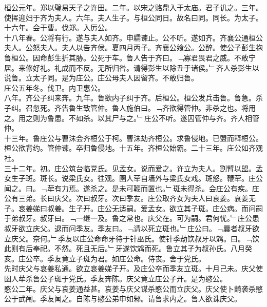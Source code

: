 \documentclass{zhvt-classic}
\begin{document}
\hspace*{2em}桓公元年。郑以璧易天子之许田。二年。以宋之赂鼎入于太庙。君子讥之。三年。使挥迎妇于齐为夫人。六年。夫人生子。与桓公同日。故名曰同。同长。为太子。\\
\hspace*{2em}十六年。会于曹。伐郑。入厉公。\\
\hspace*{2em}十八年春。公将有行。遂与夫人如齐。申繻谏止。公不听。遂如齐。齐襄公通桓公夫人。公怒夫人。夫人以告齐侯。夏四月丙子。齐襄公飨公。公醉。使公子彭生抱鲁桓公。因命彭生折其胁。公死于车。鲁人告于齐曰。﹁寡君畏君之威。不敢宁居。来修好礼。礼成而不反。无所归咎。请得彭生以除丑于诸侯。﹂齐人杀彭生以说鲁。立太子同。是为庄公。庄公母夫人因留齐。不敢归鲁。\\
\hspace*{2em}庄公五年冬。伐卫。内卫惠公。\\
\hspace*{2em}八年。齐公子纠来奔。九年。鲁欲内子纠于齐。后桓公。桓公发兵击鲁。鲁急。杀子纠。召忽死。齐告鲁生致管仲。鲁人施伯曰。﹁齐欲得管仲。非杀之也。将用之。用之则为鲁患。不如杀。以其尸与之。﹂庄公不听。遂囚管仲与齐。齐人相管仲。\\
\hspace*{2em}十三年。鲁庄公与曹沬会齐桓公于柯。曹沬劫齐桓公。求鲁侵地。已盟而释桓公。桓公欲背约。管仲谏。卒归鲁侵地。十五年。齐桓公始霸。二十三年。庄公如齐观社。\\
\hspace*{2em}三十二年。初。庄公筑台临党氏。见孟女。说而爱之。许立为夫人。割臂以盟。孟女生子斑。斑长。说梁氏女。往观。圉人荦自墙外与梁氏女戏。斑怒。鞭荦。庄公闻之。曰。﹁荦有力焉。遂杀之。是未可鞭而置也。﹂斑未得杀。会庄公有疾。庄公有三弟。长曰庆父。次曰叔牙。次曰季友。庄公取齐女为夫人曰哀姜。哀姜无子。哀姜娣曰叔姜。生子开。庄公无适嗣。爱孟女。欲立其子斑。庄公病。而问嗣于弟叔牙。叔牙曰。﹁一继一及。鲁之常也。庆父在。可为嗣。君何忧。﹂庄公患叔牙欲立庆父。退而问季友。季友曰。﹁请以死立斑也。﹂庄公曰。﹁曩者叔牙欲立庆父。奈何。﹂季友以庄公命命牙待于针巫氏。使针季劫饮叔牙以鸩。曰。﹁饮此则有后奉祀。不然。死且无后。﹂牙遂饮鸩而死。鲁立其子为叔孙氏。八月癸亥。庄公卒。季友竟立子斑为君。如庄公命。侍丧。舍于党氏。\\
\hspace*{2em}先时庆父与哀姜私通。欲立哀姜娣子开。及庄公卒而季友立斑。十月己未。庆父使圉人荦杀鲁公子斑于党氏。季友奔陈。庆父竟立庄公子开。是为愍公。\\
\hspace*{2em}愍公二年。庆父与哀姜通益甚。哀姜与庆父谋杀愍公而立庆父。庆父使卜齮袭杀愍公于武闱。季友闻之。自陈与愍公弟申如邾。请鲁求内之。鲁人欲诛庆父。\\
\end{document}

